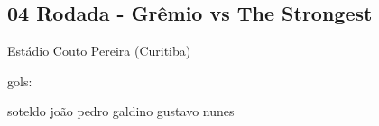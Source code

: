 \subsection{04 Rodada - Grêmio vs The Strongest}

\begin{figure}[H]
    \centering
    
\end{figure}


Estádio Couto Pereira (Curitiba)

gols:

soteldo
joão pedro
galdino
gustavo nunes